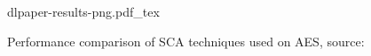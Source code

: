 \documentclass[journal]{IEEEtran}
\begin{document}
\begin{figure}[ht]
	\centering
	\def\svgwidth{\columnwidth}
	{dlpaper-results-png.pdf_tex}
	\caption[Performance comparison of SCA techniques used on the AES]{Performance comparison of SCA techniques used on AES, source: \cite[p.~16]{breaking-crypto-dl:prouff}}
	\label{fig:dlpaper-results}
\end{figure}

%
%

%
%
\end{document}
